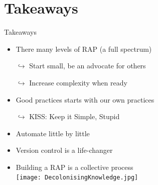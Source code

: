 \documentclass[xcolor=x11names,compress]{beamer}
\renewcommand{\(}{\begin{columns}}
\renewcommand{\)}{\end{columns}}
\newcommand{\<}[1]{\begin{column}{#1}}
\renewcommand{\>}{\end{column}}
\begin{document}
\section{Takeaways}

\begin{frame}{Takeaways }
\pause
\begin{itemize}[<+->]
    \item There many levels of RAP (a full spectrum)
    \item[$\hookrightarrow$] Start small, be an advocate for others
    \item[$\hookrightarrow$] Increase complexity when ready
    \item Good practices starts with our own practices
    \item[$\hookrightarrow$]  KISS: Keep it Simple, Stupid
    \item Automate little by little
    \item Version control is a life-changer

    \item Building a RAP is a collective process \\
        \texttt{[image: DecolonisingKnowledge.jpg]}
\end{itemize}
\end{frame}
\end{document}

